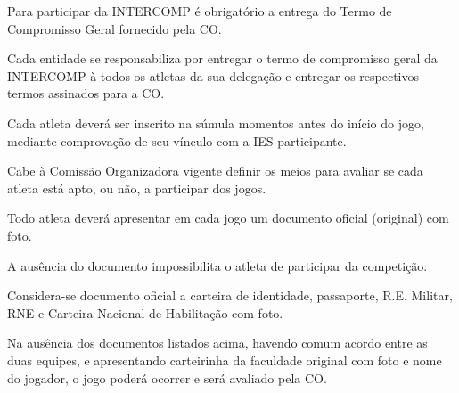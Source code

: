 \begin{article}
	Para participar da INTERCOMP é obrigatório a entrega do Termo de Compromisso Geral fornecido pela CO.

	\begin{xparagraph}
		Cada entidade se responsabiliza por entregar o termo de compromisso geral da INTERCOMP à todos os atletas da sua delegação e entregar os respectivos termos assinados para a CO.
	\end{xparagraph}
\end{article}

\begin{article}
	Cada atleta deverá ser inscrito na súmula momentos antes do início do jogo, mediante comprovação de seu vínculo com a IES participante.

	\begin{xparagraph}
		Cabe à Comissão Organizadora vigente definir os meios para avaliar se cada atleta está apto, ou não, a participar dos jogos.
	\end{xparagraph}
\end{article}

\begin{article}
	Todo atleta deverá apresentar em cada jogo um documento oficial (original) com foto.

	\begin{xparagraph}
		A ausência do documento impossibilita o atleta de participar da competição.
	\end{xparagraph}

	\begin{xparagraph}
		Considera-se documento oficial a carteira de identidade, passaporte, R.E. Militar, RNE e Carteira Nacional de Habilitação com foto.
	\end{xparagraph}

	\begin{xparagraph}
		Na ausência dos documentos listados acima, havendo comum acordo entre as duas equipes, e apresentando carteirinha da faculdade original com foto e nome do jogador, o jogo poderá ocorrer e será avaliado pela CO.
	\end{xparagraph}
\end{article}

